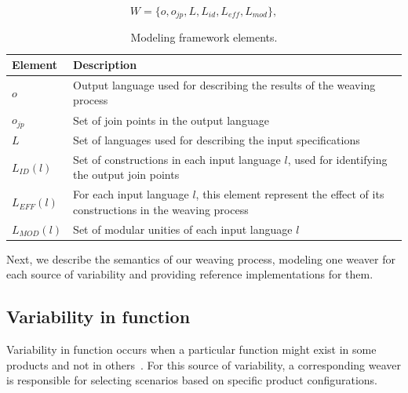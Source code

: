 \documentclass{sig-alt-full}
\begin{document}
\begin{equation}
W = \{o, o_{jp}, L, L_{id}, L_{eff}, L_{mod}\},
\label{eq:tuple}
\end{equation}

\begin{table}[h]
\begin{center}
\caption{Modeling framework elements.} \label{tab:tup-01}
\begin{tabular}{|p{0.6in}|p{2.4in}|}
  \hline
  {\bf Element} & {\bf Description} \\
   \hline
  $o$              & Output language used for describing the results of the weaving process \\ \hline
  $o_{jp}$       & Set of join points in the output language \\ \hline
  $L$              & Set of languages used for describing the input specifications \\ \hline
  $L_{ID}(l)$      & Set of constructions in each input language $l$, used for identifying the output join points \\ \hline
  $L_{EFF}(l)$   & For each input language $l$, this element represent the effect of its constructions in the weaving process \\ \hline
  $L_{MOD}(l)$  & Set of modular unities of each input language $l$\\
  \hline
\end{tabular}
\end{center}
\end{table}

Next, we describe the semantics of
our weaving process, modeling one weaver for each source of variability and
providing reference implementations for them.

\subsection{Variability in function}\label{sub:pd-weaver}

Variability in function occurs when a particular function might exist in some
products and not in others~\cite{Bachmann:2001aa}. For this source of
variability, a corresponding weaver is responsible for selecting scenarios based
on specific product configurations.
\end{document}
